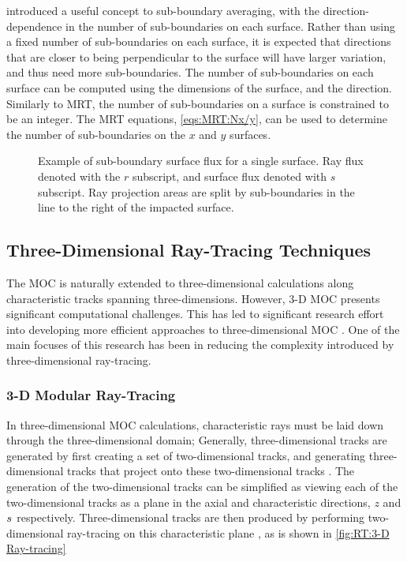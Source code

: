 {{{{          \citet{Liu2014} introduced a useful concept to sub-boundary averaging, with the direction-dependence in the number of sub-boundaries on each surface.
          Rather than using a fixed number of sub-boundaries on each surface, it is expected that directions that are closer to being perpendicular to the surface will have larger variation, and thus need more sub-boundaries.
          The number of sub-boundaries on each surface can be computed using the dimensions of the surface, and the direction.
          Similarly to \ac{MRT}, the number of sub-boundaries on a surface is constrained to be an integer.
          The \ac{MRT} equations, \cref{eqs:MRT:Nx/y}, can be used to determine the number of sub-boundaries on the $x$ and $y$ surfaces.

          \begin{figure}
            \centering
            \def\svgwidth{0.75\linewidth}
            
            \caption{
              Example of sub-boundary surface flux for a single surface.
              Ray flux denoted with the $r$ subscript, and surface flux denoted with $s$ subscript.
              Ray projection areas are split by sub-boundaries in the line to the right of the impacted surface.
              \label{fig:RT:2D SubBoundarySurfaceFlux}}
          \end{figure}
        }
      }

      \subsection{Three-Dimensional Ray-Tracing Techniques}{\label{ssec:RT:Three-Dimensional Ray-Tracing Techniques}
        The \ac{MOC} is naturally extended to three-dimensional calculations along characteristic tracks spanning three-dimensions.
        However, 3-D \ac{MOC} presents significant computational challenges.
        This has led to significant research effort into developing more efficient approaches to three-dimensional \ac{MOC} \cite{Kochunas2013,Tramm2016,Yamamoto2017,Graziano2017,Gunow2017}.
        One of the main focuses of this research has been in reducing the complexity introduced by three-dimensional ray-tracing.

        \subsubsection{3-D Modular Ray-Tracing}{\label{sssec:RT:3D Modular Ray-Tracing}
          In three-dimensional \ac{MOC} calculations, characteristic rays must be laid down through the three-dimensional domain;
          Generally, three-dimensional tracks are generated by first creating a set of two-dimensional tracks, and generating three-dimensional tracks that project onto these two-dimensional tracks \cite{Kochunas2013,Shaner2015}.
          The generation of the two-dimensional tracks can be simplified as viewing each of the two-dimensional tracks as a plane in the axial and characteristic directions, $z$ and $\len$ respectively.
          Three-dimensional tracks are then produced by performing two-dimensional ray-tracing on this characteristic plane \cite{Kochunas2013}, as is shown in \cref{fig:RT:3-D Ray-tracing}

}}}}
